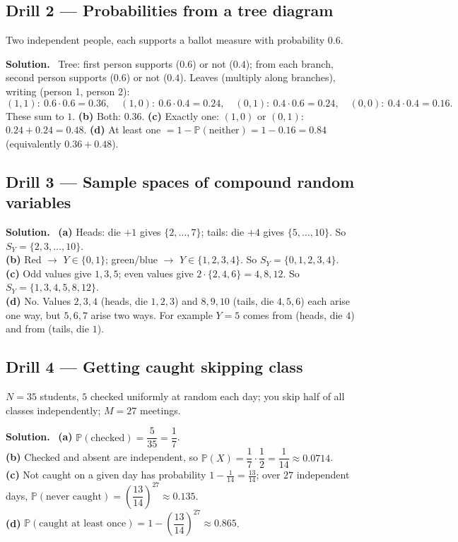 \documentclass[11pt]{article}
\renewcommand{\P}{\mathbb{P}}
\newenvironment{soln}{\par\smallskip\noindent\textbf{Solution.}\ }{\par\medskip}
\begin{document}
\subsection*{Drill 2 --- Probabilities from a tree diagram}
Two independent people, each supports a ballot measure with probability $0.6$.
\begin{soln}
Tree: first person supports ($0.6$) or not ($0.4$); from each branch, second person supports ($0.6$) or not ($0.4$). Leaves (multiply along branches), writing (person 1, person 2):
\[
(1,1):\ 0.6\cdot0.6=0.36,\quad (1,0):\ 0.6\cdot0.4=0.24,\quad (0,1):\ 0.4\cdot0.6=0.24,\quad (0,0):\ 0.4\cdot0.4=0.16.
\]
These sum to $1$. \textbf{(b)} Both: $0.36$. \textbf{(c)} Exactly one: $(1,0)$ or $(0,1)$: $0.24+0.24=0.48$.
\textbf{(d)} At least one $=1-\P(\text{neither})=1-0.16=0.84$ (equivalently $0.36+0.48$).
\end{soln}

\subsection*{Drill 3 --- Sample spaces of compound random variables}
\begin{soln}
\textbf{(a)} Heads: die $+1$ gives $\{2,\dots,7\}$; tails: die $+4$ gives $\{5,\dots,10\}$. So $S_Y=\{2,3,\dots,10\}$.\\
\textbf{(b)} Red $\to$ $Y\in\{0,1\}$; green/blue $\to$ $Y\in\{1,2,3,4\}$. So $S_Y=\{0,1,2,3,4\}$.\\
\textbf{(c)} Odd values give $1,3,5$; even values give $2\cdot\{2,4,6\}=4,8,12$. So $S_Y=\{1,3,4,5,8,12\}$.\\
\textbf{(d)} No. Values $2,3,4$ (heads, die $1,2,3$) and $8,9,10$ (tails, die $4,5,6$) each arise one way, but $5,6,7$ arise two ways. For example $Y=5$ comes from (heads, die $4$) and from (tails, die $1$).
\end{soln}

\subsection*{Drill 4 --- Getting caught skipping class}
$N=35$ students, $5$ checked uniformly at random each day; you skip half of all classes independently; $M=27$ meetings.
\begin{soln}
\textbf{(a)} $\P(\text{checked})=\dfrac5{35}=\dfrac17$.\\
\textbf{(b)} Checked and absent are independent, so $\P(X)=\dfrac17\cdot\dfrac12=\dfrac1{14}\approx0.0714$.\\
\textbf{(c)} Not caught on a given day has probability $1-\frac1{14}=\frac{13}{14}$; over $27$ independent days, $\P(\text{never caught})=\left(\dfrac{13}{14}\right)^{27}\approx0.135$.\\
\textbf{(d)} $\P(\text{caught at least once})=1-\left(\dfrac{13}{14}\right)^{27}\approx0.865$.
\end{soln}
\end{document}
